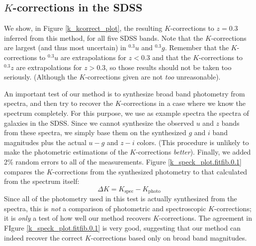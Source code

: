 \documentclass[10pt,preprint]{aastex}
\newcommand{\band}[2]{\ensuremath{^{#1}\!{#2}}}
\begin{document}
\subsection{$K$-corrections in the SDSS}

We show, in Figure \ref{k_kcorrect_plot}, the resulting $K$-corrections to
$z=0.3$ inferred from this method, for all five SDSS bands. Note that
the $K$-corrections are largest (and thus most uncertain) in
$\band{0.3}{u}$ and $\band{0.3}{g}$. Remember that the $K$-corrections
to $\band{0.3}{u}$ are extrapolations for $z<0.3$ and that the
$K$-corrections to $\band{0.3}{z}$ are extrapolations for $z>0.3$, so
those results should not be taken too seriously. (Although the
$K$-corrections given are not {\it too} unreasonable).

An important test of our method is to synthesize broad band photometry
from spectra, and then try to recover the $K$-corrections in a case
where we know the spectrum completely. For this purpose, we use as
example spectra the spectra of galaxies in the SDSS.  Since we cannot
synthesize the observed $u$ and $z$ bands from these spectra, we
simply base them on the synthesized $g$ and $i$ band magnitudes plus
the actual $u-g$ and $z-i$ colors. (This procedure is unlikely to make
the photometric estimations of the $K$-corrections {\it
better}). Finally, we added 2\% random errors to all of the
measurements. Figure \ref{k_speck_plot.fitfib.0.1} compares the
$K$-corrections from the synthesized photometry to that calculated
from the spectrum itself:
\begin{equation}
\Delta K = K_{\mathrm{spec}} - K_{\mathrm{photo}}
\end{equation}
Since all of the photometry used in this test is actually synthesized
from the spectra, this is {\it not} a comparison of photometric and
spectroscopic $K$-corrections; it is {\it only} a test of how well our
method recovers $K$-corrections. The agreement in FIgure
\ref{k_speck_plot.fitfib.0.1} is very good, suggesting that our method
can indeed recover the correct $K$-corrections based only on broad
band magnitudes.
\end{document}
